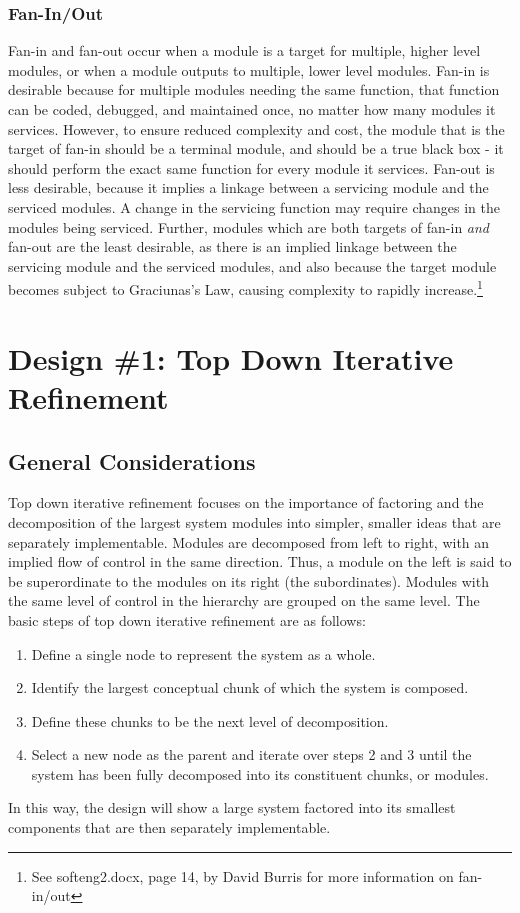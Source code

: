 \documentclass{article}
\begin{document}
		\subsubsection{Fan-In/Out}
			Fan-in and fan-out occur when a module is a target for multiple, higher level modules, or when a module outputs to multiple, lower level modules. Fan-in is desirable because for multiple modules needing the same function, that function can be coded, debugged, and maintained once, no matter how many modules it services. However, to ensure reduced complexity and cost, the module that is the target of fan-in should be a terminal module, and should be a true black box - it should perform the exact same function for every module it services. Fan-out is less desirable, because it implies a linkage between a servicing module and the serviced modules. A change in the servicing function may require changes in the modules being serviced. Further, modules which are both targets of fan-in \emph{and} fan-out are the least desirable, as there is an implied linkage between the servicing module and the serviced modules, and also because the target module becomes subject to Graciunas's Law, causing complexity to rapidly increase.\footnote{See softeng2.docx, page 14, by David Burris for more information on fan-in/out} 

%
%
\section{Design \#1: Top Down Iterative Refinement}
	\subsection{General Considerations}
		Top down iterative refinement focuses on the importance of factoring and the decomposition of the largest system modules into simpler, smaller ideas that are separately implementable. Modules are decomposed from left to right, with an implied flow of control in the same direction. Thus, a module on the left is said to be superordinate to the modules on its right (the subordinates). Modules with the same level of control in the hierarchy are grouped on the same level. The basic steps of top down iterative refinement are as follows:
		\begin{enumerate}
			\item Define a single node to represent the system as a whole.
			\item Identify the largest conceptual chunk of which the system is composed. 
			\item Define these chunks to be the next level of decomposition. 
			\item Select a new node as the parent and iterate over steps 2 and 3 until the system has been fully decomposed into its constituent chunks, or modules. 
		\end{enumerate}
		In this way, the design will show a large system factored into its smallest components that are then separately implementable. 
\end{document}
